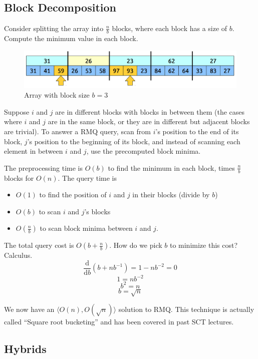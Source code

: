 \documentclass[11pt, oneside]{article}
\begin{document}
\subsection{Block Decomposition}

Consider splitting the array into \( \frac{n}{b} \) blocks, where each block
has a size of \( b \). Compute the minimum value in each block.

\begin{figure}[h!]
\centering
\includegraphics[scale=0.25]{block}
\caption{Array with block size \( b = 3 \)}
\end{figure}

Suppose \( i \) and \( j \) are in different blocks with blocks in between them
(the cases where \( i \) and \( j \) are in the same block, or they are in different but adjacent blocks
are trivial). To answer a RMQ query, scan from \( i \)'s position to the end of its block,
\( j \)'s position to the beginning of its block, and instead of scanning each element in between
\( i \) and \( j \), use the precomputed block minima.

The preprocessing time is \( O(b) \) to find the minimum in each block, times
\( \frac{n}{b} \) blocks for \( O(n) \). The query time is
\begin{itemize}
  \item \( O(1) \) to find the position of \( i \) and \( j \) in their blocks (divide by \( b \))
  \item \( O(b) \) to scan \( i \) and \( j \)'s blocks
  \item \( O(\frac{n}{b}) \) to scan block minima between \( i \) and \( j \).
\end{itemize}
The total query cost is \( O(b + \frac{n}{b}) \). How do we pick \( b \) to minimize this cost? Calculus.
\[ \frac{\mathrm{ d}}{\mathrm{ d}b} (b + n b^{-1}) = 1 - n b^{-2} = 0 \]
\[ 1 = n b^{-2} \]
\[ b^2 = n \]
\[ b = \sqrt{n} \]

We now have an \( \langle O(n), O(\sqrt{n}) \rangle \) solution to RMQ. This technique is
actually called ``Square root bucketing'' and has been covered in past SCT lectures.

\subsection{Hybrids}
\end{document}

